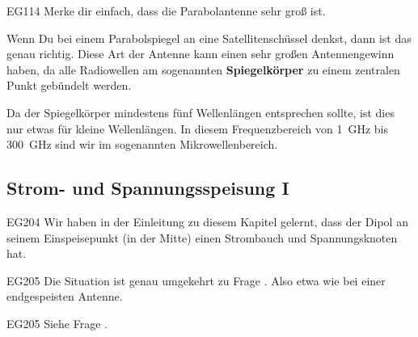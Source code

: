 \begin{sol}{EG114}
Merke dir einfach, dass die Parabolantenne sehr groß ist.
\end{sol}

\begin{ohmchapter}
    Wenn Du bei einem Parabolspiegel an eine Satellitenschüssel denkst, dann ist das genau richtig. Diese Art der Antenne kann einen sehr großen Antennengewinn haben, da alle Radiowellen am sogenannten \textbf{Spiegelkörper} zu einem zentralen Punkt gebündelt werden. 
    
    
    Da der Spiegelkörper mindestens fünf Wellenlängen entsprechen sollte, ist dies nur etwas für kleine Wellenlängen. In diesem Frequenzbereich von \SI{1}{\giga\hertz} bis \SI{300}{\giga\hertz} sind wir im sogenannten Mikrowellenbereich.
\end{ohmchapter}


\subsection{Strom- und Spannungsspeisung I}

\begin{sol}{EG204}
    Wir haben in der Einleitung zu diesem Kapitel gelernt, dass der Dipol an seinem Einspeisepunkt (in der Mitte) einen Strombauch und Spannungsknoten hat.
\end{sol}


\begin{sol}{EG205}
Die Situation ist genau umgekehrt zu Frage . Also etwa wie bei einer endgespeisten Antenne.
\end{sol}

\begin{sol}{EG205}
    Siehe Frage .
\end{sol}

